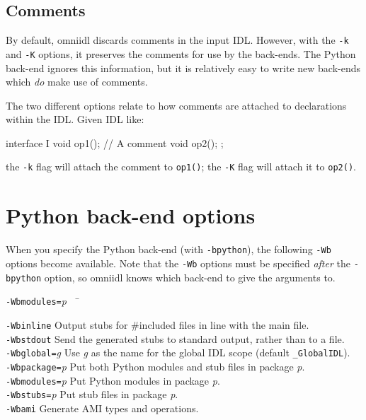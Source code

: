 \documentclass[11pt,oneside,a4paper]{book}
\newcommand{\module}[1]{\texttt{#1}}
\newcommand{\op}[1]{\texttt{#1()}}
\newcommand{\cmdline}[1]{\texttt{#1}}
\begin{document}
\subsection{Comments}

By default, omniidl discards comments in the input IDL. However, with
the \cmdline{-k} and \cmdline{-K} options, it preserves the comments
for use by the back-ends. The Python back-end ignores this
information, but it is relatively easy to write new back-ends which
\emph{do} make use of comments.

The two different options relate to how comments are attached to
declarations within the IDL. Given IDL like:

\begin{idllisting}
interface I {
  void op1();
  // A comment
  void op2();
};
\end{idllisting}

\noindent the \cmdline{-k} flag will attach the comment to \op{op1};
the \cmdline{-K} flag will attach it to \op{op2}.



\section{Python back-end options}
\label{sec:Wbglobal}

When you specify the Python back-end (with \cmdline{-bpython}), the
following \cmdline{-Wb} options become available. Note that the
\cmdline{-Wb} options must be specified \emph{after} the
\cmdline{-bpython} option, so omniidl knows which back-end to give the
arguments to.


\begin{tabbing}

\cmdline{-Wbmodules=}\textit{p}~~ \= \kill

\cmdline{-Wbinline}
     \> Output stubs for \#included files in line with the main
        file.\\

\cmdline{-Wbstdout}
     \> Send the generated stubs to standard output, rather than to a
        file.\\

\cmdline{-Wbglobal=}\textit{g}
     \> Use \textit{g} as the name for the global IDL scope (default
        \module{\_GlobalIDL}).\\

\cmdline{-Wbpackage=}\textit{p}
     \> Put both Python modules and stub files in package
        \textit{p}.\\

\cmdline{-Wbmodules=}\textit{p}
     \> Put Python modules in package \textit{p}.\\

\cmdline{-Wbstubs=}\textit{p}
     \> Put stub files in package \textit{p}.\\

\cmdline{-Wbami}
     \> Generate AMI types and operations.\\

\end{tabbing}
\end{document}
